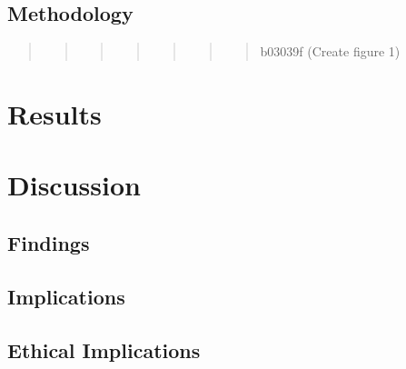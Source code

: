 \documentclass[
]{article}
\begin{document}
\hypertarget{methodology-1}{%
\subsection{Methodology}\label{methodology-1}}

\begin{quote}
\begin{quote}
\begin{quote}
\begin{quote}
\begin{quote}
\begin{quote}
\begin{quote}
b03039f (Create figure 1)
\end{quote}
\end{quote}
\end{quote}
\end{quote}
\end{quote}
\end{quote}
\end{quote}

\hypertarget{results}{%
\section{Results}\label{results}}

\hypertarget{discussion-1}{%
\section{Discussion}\label{discussion-1}}

\hypertarget{findings-1}{%
\subsection{Findings}\label{findings-1}}

\hypertarget{implications-1}{%
\subsection{Implications}\label{implications-1}}

\hypertarget{ethical-implications-1}{%
\subsection{Ethical Implications}\label{ethical-implications-1}}
\end{document}
